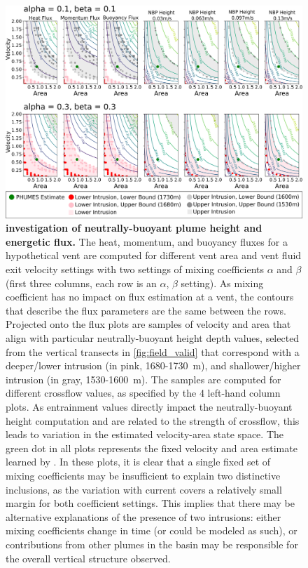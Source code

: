 \begin{figure}[h!]
    \centering
    \includegraphics[width=1\columnwidth]{figures/flux_nbp.png}
    \caption[\PHUMES investigation of neutrally-buoyant plume height and energetic flux.]{\textbf{\PHUMES investigation of neutrally-buoyant plume height and energetic flux.} The heat, momentum, and buoyancy fluxes for a hypothetical vent are computed for different vent area and vent fluid exit velocity settings with two settings of mixing coefficients $\alpha$ and $\beta$ (first three columns, each row is an $\alpha$, $\beta$ setting). As mixing coefficient has no impact on flux estimation at a vent, the contours that describe the flux parameters are the same between the rows. Projected onto the flux plots are samples of velocity and area that align with particular neutrally-buoyant height depth values, selected from the vertical transects in \cref{fig:field_valid} that correspond with a deeper/lower intrusion (in pink, 1680-\SI{1730}{\meter}), and shallower/higher intrusion (in gray, 1530-\SI{1600}{\meter}). The samples are computed for different crossflow values, as specified by the 4 left-hand column plots. As entrainment values directly impact the neutrally-buoyant height computation and are related to the strength of crossflow, this leads to variation in the estimated velocity-area state space. The green dot in all plots represents the fixed velocity and area estimate learned by \PHUMES. In these plots, it is clear that a single fixed set of mixing coefficients may be insufficient to explain two distinctive inclusions, as the variation with current covers a relatively small margin for both coefficient settings. This implies that there may be alternative explanations of the presence of two intrusions: either mixing coefficients change in time (or could be modeled as such), or contributions from other plumes in the basin may be responsible for the overall vertical structure observed.}
    \label{fig:nbp_flux}
\end{figure}


